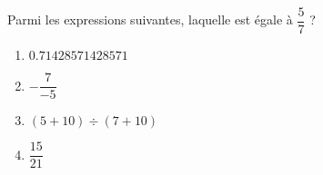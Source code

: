 
\begin{exercice}\label{exosmath-0964}

    Parmi les expressions suivantes, laquelle est égale à \( \dfrac{ 5 }{ 7 }\) ?
    \begin{multicols}{2}
        \begin{enumerate}
            \item
               $ 0.71428571428571$
            \item
                \( -\dfrac{ 7 }{ -5 }\)
            \item
                \( (5+10)\div(7+10)\)
            \item
                \( \dfrac{ 15 }{ 21 }\)
        \end{enumerate}
    \end{multicols}

\end{exercice}
